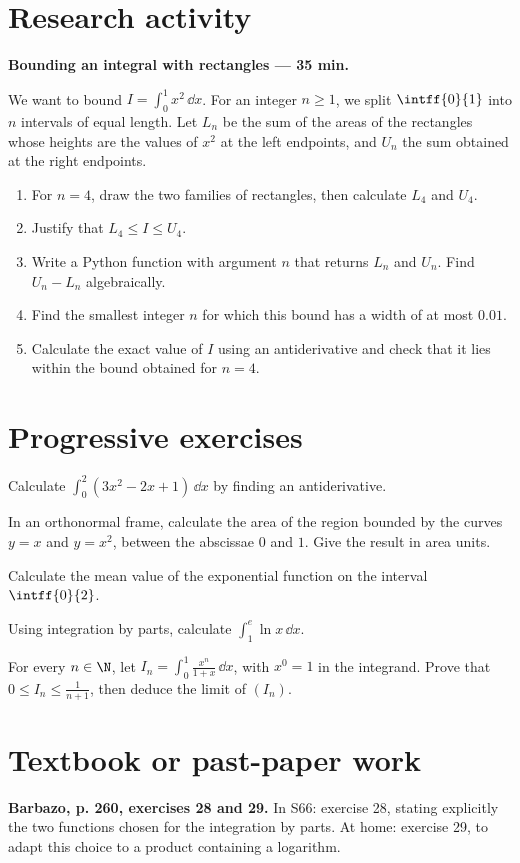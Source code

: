 \mxnewpage
\section{Research activity}\textbf{Bounding an integral with rectangles --- 35 min.}\par We want to bound $I=\displaystyle\int_0^1x^2\,\dd x$. For an integer $n\ge1$, we split $\intff{0}{1}$ into $n$ intervals of equal length. Let $L_n$ be the sum of the areas of the rectangles whose heights are the values of $x^2$ at the left endpoints, and $U_n$ the sum obtained at the right endpoints.
\begin{enumerate}\item For $n=4$, draw the two families of rectangles, then calculate $L_4$ and $U_4$.
\item Justify that $L_4\le I\le U_4$.
\item Write a Python function with argument $n$ that returns $L_n$ and $U_n$. Find $U_n-L_n$ algebraically.
\item Find the smallest integer $n$ for which this bound has a width of at most $\num{0,01}$.
\item Calculate the exact value of $I$ using an antiderivative and check that it lies within the bound obtained for $n=4$.\end{enumerate}

\mxnewpage
\section{Progressive exercises}

Calculate $\displaystyle\int_0^2(3x^2-2x+1)\,\dd x$ by finding an antiderivative.

In an orthonormal frame, calculate the area of the region bounded by the curves $y=x$ and $y=x^2$, between the abscissae $0$ and $1$. Give the result in area units.

Calculate the mean value of the exponential function on the interval $\intff{0}{2}$.

Using integration by parts, calculate $\displaystyle\int_1^e\ln x\,\dd x$.

For every $n\in\N$, let $I_n=\displaystyle\int_0^1\frac{x^n}{1+x}\,\dd x$, with $x^0=1$ in the integrand. Prove that $0\le I_n\le\frac1{n+1}$, then deduce the limit of $(I_n)$.

\section{Textbook or past-paper work}\textbf{Barbazo, p. 260, exercises 28 and 29.} In S66: exercise 28, stating explicitly the two functions chosen for the integration by parts. At home: exercise 29, to adapt this choice to a product containing a logarithm.

